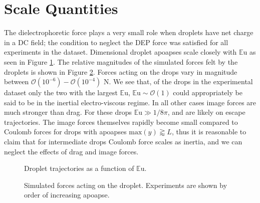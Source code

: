 \documentclass[10pt,a4paper]{article}
\begin{document}
\section{Scale Quantities}
The dielectrophoretic force plays a very small role when droplets have net charge in a DC field; the condition to neglect the DEP force was satisfied for all experiments in the dataset. Dimensional droplet apoapses scale closely with $\mathbb{E}\mbox{u}$ as seen in Figure \ref{fig:series_s_eu}. The relative magnitudes of the simulated forces felt by the droplets is shown in Figure \ref{fig:forces}. Forces acting on the drops vary in magnitude between $\mathcal{O}(10^{-6})-\mathcal{O}(10^{-4})$ N. We see that, of the drops in the experimental dataset only the two with the largest $\mathbb{E}\mbox{u}$, $\mathbb{E}\mbox{u} \sim \mathcal{O}(1)$ could appropriately be said to be in the inertial electro-viscous regime. In all other cases image forces are much stronger than drag. For these drops $\mathbb{E}\mbox{u} \gg 1/8 \pi$, and are likely on escape trajectories. The image forces themselves rapidly become small compared to Coulomb forces for drops with apoapses $\mbox{max}\left( y\right) \gtrapprox L$, thus it is reasonable to claim that for intermediate drops Coulomb force scales as inertia, and we can neglect the effects of drag and image forces.

\begin{figure}[htb]
    \centering
    
    \caption{Droplet trajectories as a function of $\mathbb{E}\mbox{u}$.\label{fig:series_s_eu}}
\end{figure}
\begin{figure}[htb]
    \centering
    \resizebox{14cm}{!}{}
    \caption{Simulated forces acting on the droplet. Experiments are shown by order of increasing apoapse.\label{fig:forces}}
\end{figure}
\end{document}
